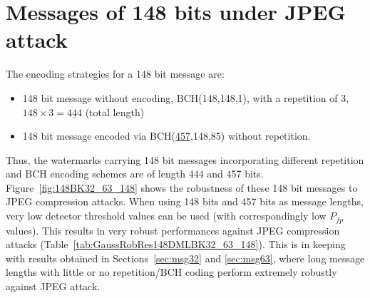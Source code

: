 \documentclass[12pt]{report}
\begin{document}
\section{Messages of 148 bits under JPEG attack} 
\label{sec:msg148}
The encoding strategies for a 148 bit message are:
\begin{itemize}
        \item 148 bit message without encoding, BCH(148,148,1), with a repetition of 3, $148 \times 3 = \underline{444}$ (total length)
        \item 148 bit message encoded via BCH(\underline{457},148,85) without repetition.
\end{itemize}
Thus, the watermarks carrying 148 bit messages incorporating different repetition and BCH encoding schemes are of length
444 and 457 bits.
Figure~\ref{fig:148BK32_63_148} shows the robustness of these 148 bit messages to JPEG compression attacks.
When using 148 bits and 457 bits as message lengths, very low detector threshold values can be used
(with correspondingly low $P_{fp}$ values). This results in very robust performances against JPEG compression attacks 
(Table~\ref{tab:GaussRobRes148DMLBK32_63_148}). 
This is in keeping with results obtained in Sections~\ref{sec:msg32} and \ref{sec:msg63}, where long message
lengths with little or no repetition/BCH coding perform extremely robustly against JPEG attack.
\end{document}
